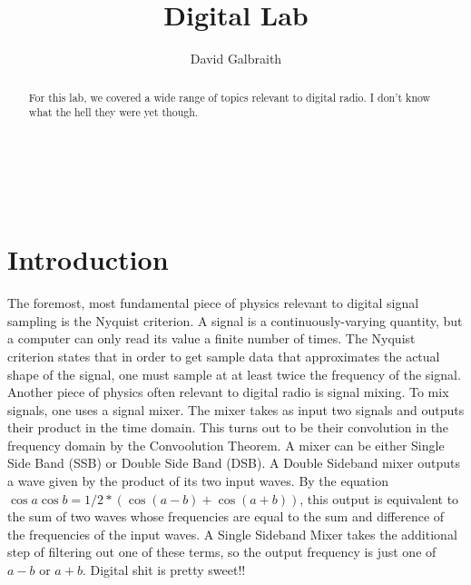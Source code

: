\documentclass[11pt]{article}
\begin{document}
\title{Digital Lab}
\author{David Galbraith}
\maketitle

\normalsize
\begin{abstract}  %

For this lab, we covered a wide range of topics relevant to digital
radio. I don't know what the hell they were yet though. %

\end{abstract}


\medskip                        %

\thispagestyle{plain}

\section{Introduction}
The foremost, most fundamental piece of physics relevant to digital
signal sampling is the Nyquist criterion. A signal is a
continuously-varying quantity, but a computer can only read its value a
finite number of times. The Nyquist criterion states that in order to
get sample data that approximates the actual shape of the signal, one
must sample at at least twice the frequency of the signal. \\

Another piece of physics often relevant to digital radio is signal mixing. To mix signals, one uses a signal mixer. The mixer takes as input two signals and outputs their product in the time domain. This turns out to be their convolution in the frequency domain by the Convoolution Theorem. A mixer can be either Single Side Band (SSB) or Double Side Band (DSB). A Double Sideband mixer outputs a wave given by the product of its two input waves. By the equation $\cos{a}\cos{b} = 1/2 * (\cos{(a - b)} + \cos{(a + b)})$, this output is equivalent to the sum of two waves whose frequencies are equal to the sum and difference of the frequencies of the input waves. A Single Sideband Mixer takes the additional step of filtering out one of these terms, so the output frequency is just one of $a - b$ or $a + b$. %
Digital shit is pretty sweet!! %
\end{document}
